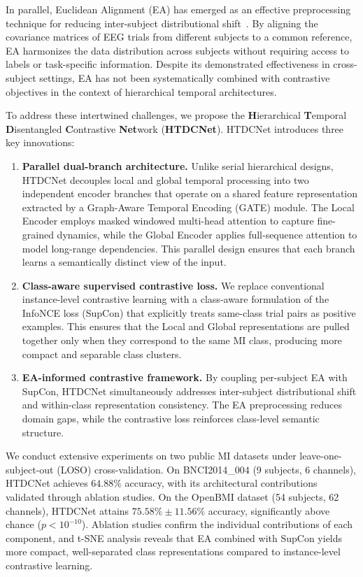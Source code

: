 \documentclass[conference]{IEEEtran}
\begin{document}
In parallel, Euclidean Alignment (EA) has emerged as an effective preprocessing technique for reducing inter-subject distributional shift~\cite{he2019transfer}.
By aligning the covariance matrices of EEG trials from different subjects to a common reference, EA harmonizes the data distribution across subjects without requiring access to labels or task-specific information.
Despite its demonstrated effectiveness in cross-subject settings, EA has not been systematically combined with contrastive objectives in the context of hierarchical temporal architectures.

To address these intertwined challenges, we propose the \textbf{H}ierarchical \textbf{T}emporal \textbf{D}isentangled \textbf{C}ontrastive \textbf{Net}work (\textbf{HTDCNet}).
HTDCNet introduces three key innovations:
\begin{enumerate}
    \item \textbf{Parallel dual-branch architecture.} Unlike serial hierarchical designs, HTDCNet decouples local and global temporal processing into two independent encoder branches that operate on a shared feature representation extracted by a Graph-Aware Temporal Encoding (GATE) module. The Local Encoder employs masked windowed multi-head attention to capture fine-grained dynamics, while the Global Encoder applies full-sequence attention to model long-range dependencies. This parallel design ensures that each branch learns a semantically distinct view of the input.
    \item \textbf{Class-aware supervised contrastive loss.} We replace conventional instance-level contrastive learning with a class-aware formulation of the InfoNCE loss (SupCon) that explicitly treats same-class trial pairs as positive examples. This ensures that the Local and Global representations are pulled together only when they correspond to the same MI class, producing more compact and separable class clusters.
    \item \textbf{EA-informed contrastive framework.} By coupling per-subject EA with SupCon, HTDCNet simultaneously addresses inter-subject distributional shift and within-class representation consistency. The EA preprocessing reduces domain gaps, while the contrastive loss reinforces class-level semantic structure.
\end{enumerate}

We conduct extensive experiments on two public MI datasets under leave-one-subject-out (LOSO) cross-validation.
On BNCI2014\_004 (9 subjects, 6 channels), HTDCNet achieves $64.88\%$ accuracy, with its architectural contributions validated through ablation studies.
On the OpenBMI dataset (54 subjects, 62 channels), HTDCNet attains $75.58\% \pm 11.56\%$ accuracy, significantly above chance ($p < 10^{-10}$).
Ablation studies confirm the individual contributions of each component, and t-SNE analysis reveals that EA combined with SupCon yields more compact, well-separated class representations compared to instance-level contrastive learning.
\end{document}
